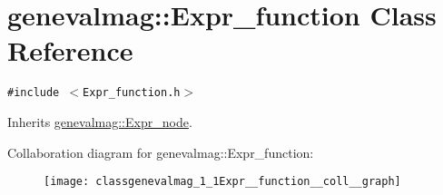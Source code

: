 \hypertarget{classgenevalmag_1_1Expr__function}{
\section{genevalmag::Expr\_\-function Class Reference}
\label{classgenevalmag_1_1Expr__function}
}
{\tt \#include $<$Expr\_\-function.h$>$}

Inherits \hyperlink{classgenevalmag_1_1Expr__node}{genevalmag::Expr\_\-node}.

Collaboration diagram for genevalmag::Expr\_\-function:\nopagebreak
\begin{figure}[H]
\begin{center}
\leavevmode
\texttt{[image: classgenevalmag\_1\_1Expr\_\_function\_\_coll\_\_graph]}
\end{center}
\end{figure}
